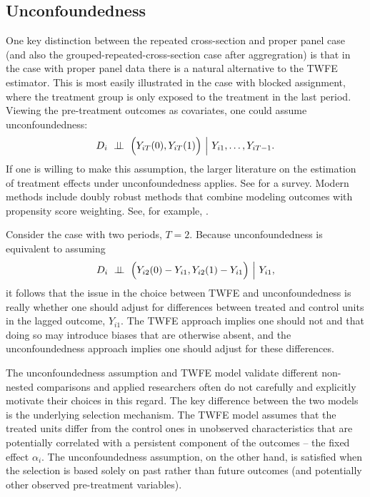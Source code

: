 \documentclass[letterpaper,12pt,leqno]{article}
\newcommand{\indep}{\perp\!\!\!\perp}
\begin{document}
\subsection{Unconfoundedness}\label{section_unconf}

One key distinction between the repeated cross-section and proper panel case (and also the grouped-repeated-cross-section case after aggregration) is that 
in the case with proper panel data there is a natural alternative to the TWFE estimator. This is most easily illustrated in the case with blocked assignment, where the treatment group is only exposed to the treatment in the last period. Viewing the pre-treatment outcomes as covariates, one could assume unconfoundedness:
\begin{equation}
 D_i\ \indep\ \Bigl(Y_{iT}(0),Y_{iT}(1)\Bigr)\ \Bigl|\ 
 Y_{i1},\ldots,Y_{iT-1}.
\end{equation}
If one is willing to make this assumption, the larger literature on the estimation of treatment effects under unconfoundedness applies. See
\citep{imbens2004} for a survey. Modern methods include doubly robust methods that combine modeling outcomes with propensity score weighting. 
See, for example, \citep{bang2005doubly,  chernozhukov2017double, athey2018approximate}.

Consider the case with two periods, $T=2$.
Because unconfoundedness is equivalent to assuming
\[D_i\ \indep\ \Bigl(Y_{i2}(0)-Y_{i1},Y_{i2}(1)-Y_{i1}\Bigr)\ \Bigl|\ 
 Y_{i1},\]
 it follows that the issue in the choice between TWFE and unconfoundedness is really whether one should adjust for differences 
 between treated and control units in the lagged outcome, $Y_{i1}$. The TWFE approach implies one should not and that doing so may introduce biases that are otherwise absent, and the unconfoundedness approach implies one should adjust for these differences. 

The unconfoundedness assumption and TWFE model validate different non-nested comparisons and applied researchers often do not carefully and explicitly motivate their choices in this regard. The key difference between the two models is the underlying selection mechanism. The TWFE model assumes that the treated units differ from the control ones in unobserved characteristics that are potentially correlated with a persistent component of the outcomes -- the fixed effect $\alpha_i$. The unconfoundedness assumption, on the other hand, is satisfied when the selection is based solely on past rather than future outcomes (and potentially other observed pre-treatment variables). 
 
\end{document}
